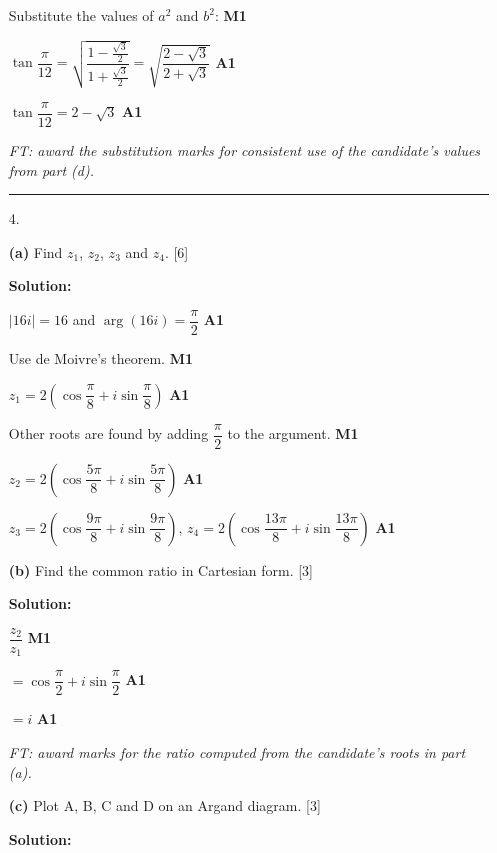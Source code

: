 \documentclass[12pt, twoside]{article}
\begin{document}
\begin{enumerate}[itemsep=0.3cm]
Substitute the values of $a^2$ and $b^2$: \hfill \textbf{M1}

$\tan\dfrac{\pi}{12}
= \sqrt{\dfrac{1 - \frac{\sqrt{3}}{2}}{1 + \frac{\sqrt{3}}{2}}}
= \sqrt{\dfrac{2 - \sqrt{3}}{2 + \sqrt{3}}}$ \hfill \textbf{A1}

$\tan\dfrac{\pi}{12} = 2 - \sqrt{3}$ \hfill \textbf{A1}

\emph{FT: award the substitution marks for consistent use of the candidate's values from part (d).}

\bigskip
\hrule
\bigskip

\item[4.] 

\textbf{(a)} Find $z_1$, $z_2$, $z_3$ and $z_4$. \hfill [6]

\textbf{Solution:}

$|16i| = 16$ and $\arg(16i) = \dfrac{\pi}{2}$ \hfill \textbf{A1}

Use de Moivre's theorem. \hfill \textbf{M1}

$z_1 = 2\left(\cos\dfrac{\pi}{8} + i\sin\dfrac{\pi}{8}\right)$ \hfill \textbf{A1}

Other roots are found by adding $\dfrac{\pi}{2}$ to the argument. \hfill \textbf{M1}

$z_2 = 2\left(\cos\dfrac{5\pi}{8} + i\sin\dfrac{5\pi}{8}\right)$ \hfill \textbf{A1}

$z_3 = 2\left(\cos\dfrac{9\pi}{8} + i\sin\dfrac{9\pi}{8}\right)$,
$z_4 = 2\left(\cos\dfrac{13\pi}{8} + i\sin\dfrac{13\pi}{8}\right)$ \hfill \textbf{A1}

\medskip

\textbf{(b)} Find the common ratio in Cartesian form. \hfill [3]

\textbf{Solution:}

$\dfrac{z_2}{z_1}$ \hfill \textbf{M1}

$= \cos\dfrac{\pi}{2} + i\sin\dfrac{\pi}{2}$ \hfill \textbf{A1}

$= i$ \hfill \textbf{A1}

\emph{FT: award marks for the ratio computed from the candidate's roots in part (a).}

\medskip

\textbf{(c)} Plot A, B, C and D on an Argand diagram. \hfill [3]

\textbf{Solution:}


\end{enumerate}
\end{document}
